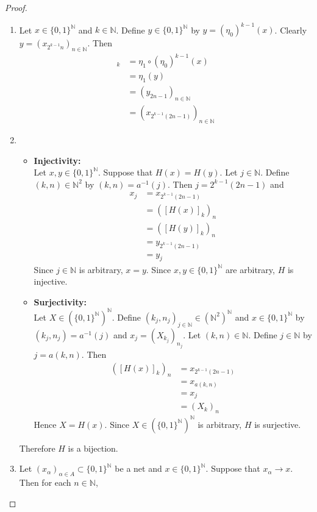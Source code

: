 \documentclass{book}
\theoremstyle{definition}
\newcommand{\al}{\alpha}
\newcommand{\N}{\mathbb{N}}
\DeclareMathOperator*{\0}{\mbf{0}}
\DeclareMathOperator*{\1}{\mbf{1}}
\begin{document}
	\begin{proof}\
		\begin{enumerate}
			\item Let $x \in \{0,1\}^{\N}$ and $k \in \N$. Define $y \in \{0,1\}^{\N}$ by $ y = (\eta_0)^{k-1}(x)$. Clearly $y = (x_{2^{k-1}n})_{n \in \N}$. Then 
			\begin{align*}
				[H(x)]_k
				& = \eta_1 \circ (\eta_0)^{k-1}(x) \\
				& = \eta_1(y) \\
				& = (y_{2n-1})_{n \in \N} \\
				& =  (x_{2^{k-1}(2n-1)})_{n \in \N}
			\end{align*}
			\item  
			\begin{itemize}
				\item \textbf{Injectivity:} \\
				Let $x, y \in \{0,1\}^{\N}$. Suppose that $H(x) = H(y)$. Let $j \in \N$. Define $(k,n) \in \N^2$ by $(k,n) = a^{-1}(j)$. Then $j = 2^{k-1}(2n-1)$ and
				\begin{align*}
					x_j
					& = x_{2^{k-1}(2n-1)} \\
					& = ([H(x)]_k)_n \\
					& = ([H(y)]_k)_n \\
					& = y_{2^{k-1}(2n-1)} \\
					& = y_j
				\end{align*}
				Since $j \in \N$ is arbitrary, $x = y$. Since $x,y \in \{0,1\}^{\N}$ are arbitrary, $H$ is injective.
				\item \textbf{Surjectivity:} \\
				Let $X \in (\{0,1\}^{\N})^{\N}$. Define $(k_j,n_j)_{j \in \N} \in (\N^2)^{\N}$ and $x \in \{0,1\}^{\N}$ by $(k_j,n_j) = a^{-1}(j)$ and $x_j = (X_{k_j})_{n_j}$. Let $(k,n) \in \N$. Define $j \in \N$ by $j = a(k,n)$. Then
				\begin{align*}
					([H(x)]_{k})_{n} 
					& = x_{2^{k-1}(2n-1)} \\
					& = x_{a(k, n)} \\
					& = x_j \\
					& = (X_{k})_{n}
				\end{align*}
				Hence $X = H(x)$. Since $X \in (\{0,1\}^{\N})^{\N}$ is arbitrary, $H$ is surjective.
			\end{itemize}
			Therefore $H$ is a bijection.
			\item Let $(x_{\al})_{\al \in A} \subset \{0,1\}^{\N}$ be a net and $x \in \{0,1\}^{\N}$. Suppose that $x_{\al} \rightarrow x$. Then for each $n \in \N$, 

\end{enumerate}
\end{proof}
\end{document}
